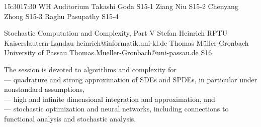 \documentclass[12pt,lettersize,oneside]{book} %
\begin{document}

\sessionPart{}%
{\hfill{}
{15:30}{17:30} %
{WH Auditorium}} %
{Takashi Goda}
{S15-1}
{Ziang Niu}
{S15-2}
{Chenyang Zhong}
{S15-3}
{Raghu Pasupathy}
{S15-4}



\clearpage

\begin{session}
 {Stochastic Computation and Complexity, Part V}%
 {Stefan Heinrich}%
 {RPTU Kaiserslautern-Landau}%
 {heinrich@informatik.uni-kl.de}%
 {Thomas M\"uller-Gronbach}%
 {University of Passau}%
 {Thomas.Mueller-Gronbach@uni-passau.de}%
 {S16}%
 {}%

 The session is devoted to algorithms and complexity for\\
 --- quadrature and strong approximation of SDEs and SPDEs, in particular under nonstandard assumptions,\\
 --- high and infinite dimensional integration and approximation, and\\
 --- stochastic optimization and neural networks,
 including connections to functional analysis and stochastic analysis.
\end{session}


\end{document}
